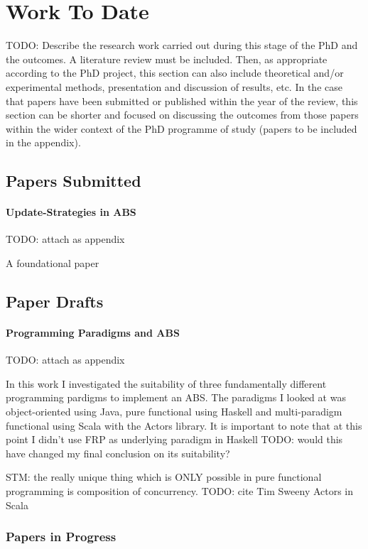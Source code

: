\section{Work To Date}
TODO: Describe the research work carried out during this stage of the PhD and the outcomes. A literature review must be included. Then, as appropriate according to the PhD project, this section can also include theoretical and/or experimental methods, presentation and discussion of results, etc. In the case that papers have been submitted or published within the year of the review, this section can be shorter and focused on discussing the outcomes from those papers within the wider context of the PhD programme of study (papers to be included in the appendix).


\subsection{Papers Submitted}
\paragraph{Update-Strategies in ABS}
TODO: attach as appendix

A foundational paper

\subsection{Paper Drafts}
\paragraph{Programming Paradigms and ABS}
TODO: attach as appendix

In this work I investigated the suitability of three fundamentally different programming pardigms to implement an ABS. The paradigms I looked at was object-oriented using Java, pure functional using Haskell and multi-paradigm functional using Scala with the Actors library. It is important to note that at this point I didn't use FRP as underlying paradigm in Haskell TODO: would this have changed my final conclusion on its suitability?

STM: the really unique thing which is ONLY possible in pure functional programming is composition of concurrency. TODO: cite Tim Sweeny
Actors in Scala

\subsubsection{Papers in Progress}
